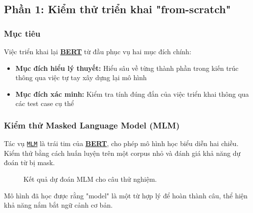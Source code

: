 \subsection{Phần 1: Kiểm thử triển khai "from-scratch"}
\label{ssec:kiem_thu_from_scratch}

\subsubsection{Mục tiêu}

Việc triển khai lại \hyperref[acro:bert]{\textbf{BERT}} từ đầu phục vụ hai mục đích chính:
\begin{itemize}
    \item \textbf{Mục đích hiểu lý thuyết:} Hiểu sâu về từng thành phần trong kiến trúc thông qua việc tự tay xây dựng lại mô hình
    \item \textbf{Mục đích xác minh:} Kiểm tra tính đúng đắn của việc triển khai thông qua các test case cụ thể
\end{itemize}

\subsubsection{Kiểm thử Masked Language Model (MLM)}

Tác vụ \hyperref[acro:mlm]{\texttt{MLM}} là trái tim của \hyperref[acro:bert]{\textbf{BERT}}, cho phép mô hình học biểu diễn hai chiều. Kiểm thử bằng cách huấn luyện trên một corpus nhỏ và đánh giá khả năng dự đoán từ bị mask.

\begin{figure}[H]
\centering
{}
\caption{Kết quả dự đoán MLM cho câu thử nghiệm.}
\label{fig:mlm_test_results}
\end{figure}
Mô hình đã học được rằng "model" là một từ hợp lý để hoàn thành câu, thể hiện khả năng nắm bắt ngữ cảnh cơ bản.

